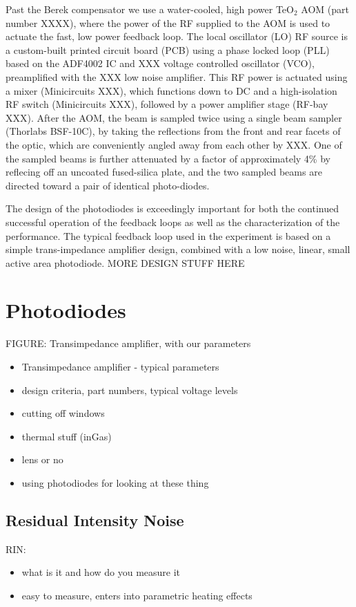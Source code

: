 \documentclass[twocolumn,aps,pra,showpacs,preprintnumbers,bibnotes]{revtex4-1}
\begin{document}
Past the Berek compensator we use a water-cooled, high power TeO$_2$ AOM (part number XXXX), where the power of the RF supplied to the AOM is used to actuate the fast, low power feedback loop.
The local oscillator (LO) RF source is a custom-built printed circuit board (PCB) using a phase locked loop (PLL) based on the ADF4002 IC and XXX voltage controlled oscillator (VCO), preamplified with the XXX low noise amplifier. 
This RF power is actuated using a mixer (Minicircuits XXX), which functions down to DC and a high-isolation RF switch (Minicircuits XXX), followed by a power amplifier stage (RF-bay XXX). After the AOM, the beam is sampled twice using a single beam sampler (Thorlabs BSF-10C), by taking the reflections from the front and rear facets of the optic, which are conveniently angled away from each other by XXX.
One of the sampled beams is further attenuated by a factor of approximately 4\% by reflecing off an uncoated fused-silica plate, and the two sampled beams are directed toward a pair of identical photo-diodes. 

The design of the photodiodes is exceedingly important for both the continued successful operation of the feedback loops as well as the characterization of the performance. The typical feedback loop used in the experiment is based on a simple trans-impedance amplifier design, combined with a low noise, linear, small active area photodiode. MORE DESIGN STUFF HERE



\section{Photodiodes}
FIGURE: Transimpedance amplifier, with our parameters
\begin{itemize}
	\item Transimpedance amplifier - typical parameters
	\item design criteria, part numbers, typical voltage levels
	\item cutting off windows
	\item thermal stuff (inGas)
	\item lens or no
	\item using photodiodes for looking at these thing
\end{itemize}

\subsection{Residual Intensity Noise}
RIN:
\begin{itemize}
\item what is it and how do you measure it
\item easy to measure, enters into parametric heating effects
\end{itemize}
\end{document}
